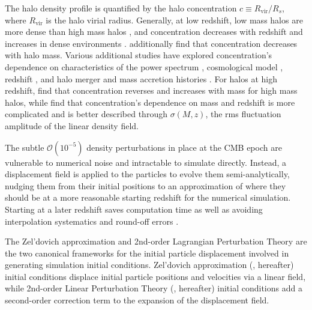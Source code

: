 The halo density profile is quantified by the halo concentration $c \equiv R_{\mathrm{vir}} / R_{s}$, where $R_{\mathrm{vir}}$ is the halo virial radius.  Generally, at low redshift, low mass halos are more dense than high mass halos \citep{1997ApJ...490..493N}, and concentration decreases with redshift and increases in dense environments \citep{2001MNRAS.321..559B}.  \citet{2007MNRAS.381.1450N} additionally find that concentration decreases with halo mass.  Various additional studies have explored concentration's dependence on characteristics of the power spectrum \citep{2001ApJ...554..114E}, cosmological model \citep{2008MNRAS.391.1940M}, redshift \citep{2008MNRAS.387..536G, 2011MNRAS.411..584M}, and halo merger and mass accretion histories \citep{2002ApJ...568...52W, 2003MNRAS.339...12Z, 2009ApJ...707..354Z}.  For halos at high redshift, \citet{2011ApJ...740..102K} find that concentration reverses and increases with mass for high mass halos, while \citet{2012MNRAS.423.3018P} find that concentration's dependence on mass and redshift is more complicated and is better described through $\sigma(M,z)$, the rms fluctuation amplitude of the linear density field.






The subtle $\mathcal{O}(10^{-5})$ density perturbations in place at the CMB epoch are vulnerable to numerical noise and intractable to simulate directly.  Instead, a displacement field is applied to the particles to evolve them semi-analytically, nudging them from their initial positions to an approximation of where they should be at a more reasonable starting redshift for the numerical simulation.  Starting at a later redshift saves computation time as well as avoiding interpolation systematics and round-off errors \citep{2007ApJ...671.1160L}.






The Zel'dovich approximation \citep{1970A&A.....5...84Z} and 2nd-order Lagrangian Perturbation Theory \citep{1994MNRAS.267..811B, 1994A&A...288..349B, 1995A&A...296..575B, 1998MNRAS.299.1097S} are the two canonical frameworks for the initial particle displacement involved in generating simulation initial conditions.  Zel'dovich approximation (\za, hereafter) initial conditions \citep{1983MNRAS.204..891K, 1985ApJS...57..241E} displace initial particle positions and velocities via a linear field, while 2nd-order Linear Perturbation Theory (\lpt, hereafter) initial conditions \citep{1998MNRAS.299.1097S, 2005ApJ...634..728S, 2010MNRAS.403.1859J} add a second-order correction term to the expansion of the displacement field.


